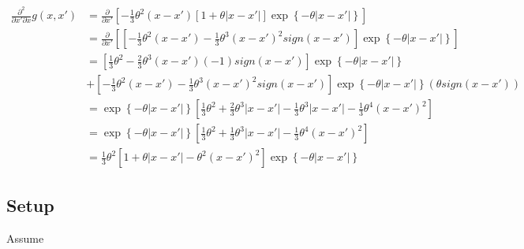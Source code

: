 \documentclass{sfuthesis}
\begin{document}
\begin{align}
\frac{{{\partial ^2}}}{{\partial x'\partial x}}g\left( {x,x'} \right) &= \frac{\partial }{{\partial x'}}\left[ { - \frac{1}{3}{\theta ^2}\left( {x - x'} \right)\left[ {1 + \theta \left| {x - x'} \right|} \right]\exp \left\{ { - \theta \left| {x - x'} \right|} \right\}} \right]\\
 &= \frac{\partial }{{\partial x'}}\left[ {\left[ { - \frac{1}{3}{\theta ^2}\left( {x - x'} \right) - \frac{1}{3}{\theta ^3}{{\left( {x - x'} \right)}^2}sign\left( {x - x'} \right)} \right]\exp \left\{ { - \theta \left| {x - x'} \right|} \right\}} \right]\\
 &= \left[ {\frac{1}{3}{\theta ^2} - \frac{2}{3}{\theta ^3}\left( {x - x'} \right)\left( { - 1} \right)sign\left( {x - x'} \right)} \right]\exp \left\{ { - \theta \left| {x - x'} \right|} \right\}\\
 &+ \left[ { - \frac{1}{3}{\theta ^2}\left( {x - x'} \right) - \frac{1}{3}{\theta ^3}{{\left( {x - x'} \right)}^2}sign\left( {x - x'} \right)} \right]\exp \left\{ { - \theta \left| {x - x'} \right|} \right\}\left( {\theta sign\left( {x - x'} \right)} \right)\\
 &= \exp \left\{ { - \theta \left| {x - x'} \right|} \right\}\left[ {\frac{1}{3}{\theta ^2} + \frac{2}{3}{\theta ^3}\left| {x - x'} \right| - \frac{1}{3}{\theta ^3}\left| {x - x'} \right| - \frac{1}{3}{\theta ^4}{{\left( {x - x'} \right)}^2}} \right]\\
 &= \exp \left\{ { - \theta \left| {x - x'} \right|} \right\}\left[ {\frac{1}{3}{\theta ^2} + \frac{1}{3}{\theta ^3}\left| {x - x'} \right| - \frac{1}{3}{\theta ^4}{{\left( {x - x'} \right)}^2}} \right]\\
 &= \frac{1}{3}{\theta ^2}\left[ {1 + \theta \left| {x - x'} \right| - {\theta ^2}{{\left( {x - x'} \right)}^2}} \right]\exp \left\{ { - \theta \left| {x - x'} \right|} \right\}
\end{align}




\subsection{Setup}

Assume
\end{document}
